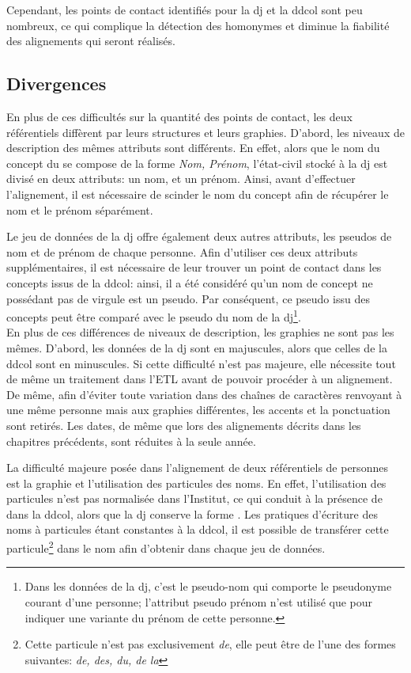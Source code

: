 Cependant, les points de contact identifiés pour la \ac{dj} et la \ac{ddcol} sont peu nombreux, ce qui complique la détection des homonymes et diminue la fiabilité des alignements qui seront réalisés.

\subsection{\label{III-C-1-c}Divergences}

En plus de ces difficultés sur la quantité des points de contact, les deux référentiels diffèrent par leurs structures et leurs graphies. D'abord, les niveaux de description des mêmes attributs sont différents. En effet, alors que le nom du concept du \ldd se compose de la forme \textit{Nom, Prénom}, l'état-civil stocké à la \ac{dj} est divisé en deux attributs: un nom, et un prénom. Ainsi, avant d'effectuer l'alignement, il est nécessaire de scinder le nom du concept afin de récupérer le nom et le prénom séparément.

\noindent Le jeu de données de la \ac{dj} offre également deux autres attributs, les pseudos de nom et de prénom de chaque personne. Afin d'utiliser ces deux attributs supplémentaires, il est nécessaire de leur trouver un point de contact dans les concepts issus de la \ac{ddcol}: ainsi, il a été considéré qu'un nom de concept ne possédant pas de virgule est un pseudo. Par conséquent, ce pseudo issu des concepts peut être comparé avec le pseudo du nom de la \ac{dj}\footnote{Dans les données de la \ac{dj}, c'est le pseudo-nom qui comporte le pseudonyme courant d'une personne; l'attribut pseudo prénom n'est utilisé que pour indiquer une variante du prénom de cette personne.}.\\

En plus de ces différences de niveaux de description, les graphies ne sont pas les mêmes. D'abord, les données de la \ac{dj} sont en majuscules, alors que celles de la \ac{ddcol} sont en minuscules. Si cette difficulté n'est pas majeure, elle nécessite tout de même un traitement dans l'ETL avant de pouvoir procéder à un alignement. De même, afin d'éviter toute variation dans des chaînes de caractères renvoyant à une même personne mais aux graphies différentes, les accents et la ponctuation sont retirés. Les dates, de même que lors des alignements décrits dans les chapitres précédents, sont réduites à la seule année.

\noindent La difficulté majeure posée dans l'alignement de deux référentiels de personnes est la graphie et l'utilisation des particules des noms. En effet, l'utilisation des particules n'est pas normalisée dans l'Institut, ce qui conduit à la présence de  dans la \ac{ddcol}, alors que la \ac{dj} conserve la forme . Les pratiques d'écriture des noms à particules étant constantes à la \ac{ddcol}, il est possible de transférer cette particule\footnote{Cette particule n'est pas exclusivement \textit{de}, elle peut être de l'une des formes suivantes: \textit{de, des, du, de la}} dans le nom afin d'obtenir   dans chaque jeu de données.\\


